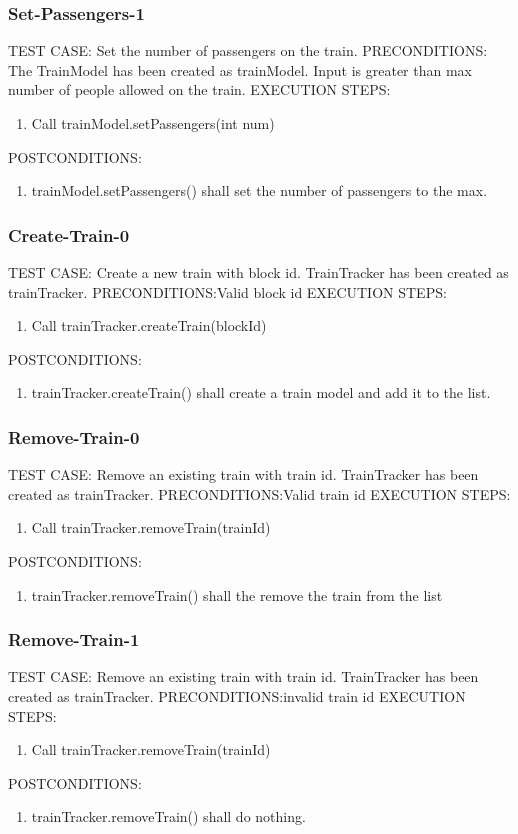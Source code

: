 \documentclass{scrreprt}
\begin{document}
\subsubsection{Set-Passengers-1}
TEST CASE: Set the number of passengers on the train.
PRECONDITIONS: The TrainModel has been created as trainModel. Input is greater than max number of people allowed on the train.
EXECUTION STEPS:
\begin{enumerate}
	\item Call trainModel.setPassengers(int num)
\end{enumerate}
POSTCONDITIONS:
\begin{enumerate}
	\item trainModel.setPassengers() shall set the number of passengers to the max.
\end{enumerate}

\subsubsection{Create-Train-0}
TEST CASE: Create a new train with block id. TrainTracker has been created as trainTracker.
PRECONDITIONS:Valid block id
EXECUTION STEPS:
\begin{enumerate}
	\item Call trainTracker.createTrain(blockId)
\end{enumerate}
POSTCONDITIONS:
\begin{enumerate}
	\item trainTracker.createTrain() shall create a train model and add it to the list.
\end{enumerate}

\subsubsection{Remove-Train-0}
TEST CASE: Remove an existing train with train id. TrainTracker has been created as trainTracker.
PRECONDITIONS:Valid train id
EXECUTION STEPS:
\begin{enumerate}
	\item Call trainTracker.removeTrain(trainId)
\end{enumerate}
POSTCONDITIONS:
\begin{enumerate}
	\item trainTracker.removeTrain() shall the remove the train from the list
\end{enumerate}

\subsubsection{Remove-Train-1}
TEST CASE: Remove an existing train with train id. TrainTracker has been created as trainTracker.
PRECONDITIONS:invalid train id
EXECUTION STEPS:
\begin{enumerate}
	\item Call trainTracker.removeTrain(trainId)
\end{enumerate}
POSTCONDITIONS:
\begin{enumerate}
	\item trainTracker.removeTrain() shall do nothing.
\end{enumerate}
\end{document}
